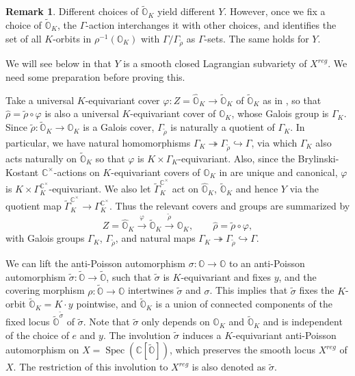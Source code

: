 \documentclass[11pt, a4paper]{amsart}
\newcommand{\C}{\mathbb{C}}
\newcommand{\orb}{\mathbb{O}}
\newcommand{\orbk}{\orb_{K}}
\newcommand{\torbk}{\widetilde{\orb}_{K}}
\newcommand{\horbk}{\widehat{\orb}_{K}}
\newcommand{\tGamma}{\widetilde{\Gamma}}
\newcommand{\cm}{\C^\times}
\newcommand{\spec}{\operatorname{Spec}}
\theoremstyle{definition}
\newtheorem{Rem}[Thm]{Remark}
\numberwithin{equation}{section}
\begin{document}
\begin{Rem} \label{rem:choice_Y}
	Different choices of $\torbk$ yield different $Y$. However, once we fix a choice of $\torbk$, the $\Gamma$-action interchanges it with other choices, and identifies the set of all $K$-orbits in $\rho^{-1}(\orbk)$ with $\Gamma/\Gamma_{\tilde{\rho}}$ as $\Gamma$-sets. The same holds for $Y$.
\end{Rem}

We will see below in  that $Y$ is a smooth closed Lagrangian subvariety of $X^{reg}$. We need some preparation before proving this.

Take a universal $K$-equivariant cover $\varphi: Z=\horbk \to \torbk$ of $\torbk$ as in , so that 
$\hat{\rho} = \tilde{\rho} \circ \varphi$ 
is also a universal $K$-equivariant cover of $\orbk$, whose Galois group is $\Gamma_K$. Since $\tilde{\rho}: \torbk \to \orbk$ is a Galois cover, $\Gamma_{\tilde{\rho}}$ is naturally a quotient of $\Gamma_K$. In particular, we have natural homomorphisms $\Gamma_K \twoheadrightarrow \Gamma_{\tilde{\rho}} \hookrightarrow \Gamma$, via which $\Gamma_K$ also acts naturally on $\torbk$ so that $\varphi$ is $K \times \Gamma_K$-equivariant. Also, since the Brylinski-Kostant $\cm$-actions on $K$-equivariant covers of $\orbk$ in  are unique and canonical, $\varphi$ is $K \times \Gamma_K^{\cm}$-equivariant. We also let $\tGamma_K^{\cm}$ act on $\horbk$, $\torbk$ and hence $Y$ via the quotient map $\tGamma_K^{\cm} \to \Gamma_K^{\cm}$.
Thus the relevant covers and groups are summarized by
\[
	Z=\horbk \xrightarrow{\varphi} \torbk \xrightarrow{\tilde{\rho}} \orbk, \qquad
	\hat{\rho}=\tilde{\rho}\circ\varphi,
\]
with Galois groups $\Gamma_K$, $\Gamma_{\tilde{\rho}}$, and natural maps $\Gamma_K \twoheadrightarrow \Gamma_{\tilde{\rho}} \hookrightarrow \Gamma$.

We can lift the anti-Poisson automorphism $\sigma: \orb \to \orb$ to an anti-Poisson automorphism $\tilde{\sigma}: \widetilde{\orb} \to \widetilde{\orb}$, such that $\tilde{\sigma}$ is $K$-equivariant and fixes $y$, and the covering morphism $\rho: \widetilde{\orb} \to \orb$ intertwines $\tilde{\sigma}$ and $\sigma$. This implies that $\tilde{\sigma}$ fixes the $K$-orbit $\torbk = K \cdot y$ pointwise, and $\torbk$ is a union of connected components of the fixed locus $\widetilde{\orb}^{\tilde{\sigma}}$ of $\tilde{\sigma}$. Note that $\tilde{\sigma}$ only depends on $\orbk$ and $\torbk$ and is independent of the choice of $e$ and $y$.
The involution $\tilde{\sigma}$ induces a $K$-equivariant anti-Poisson automorphism on $X = \spec(\C[\widetilde{\orb}])$, which preserves the smooth locus $X^{reg}$ of $X$. The restriction of this involution to $X^{reg}$ is also denoted as $\tilde{\sigma}$. 
\end{document}
